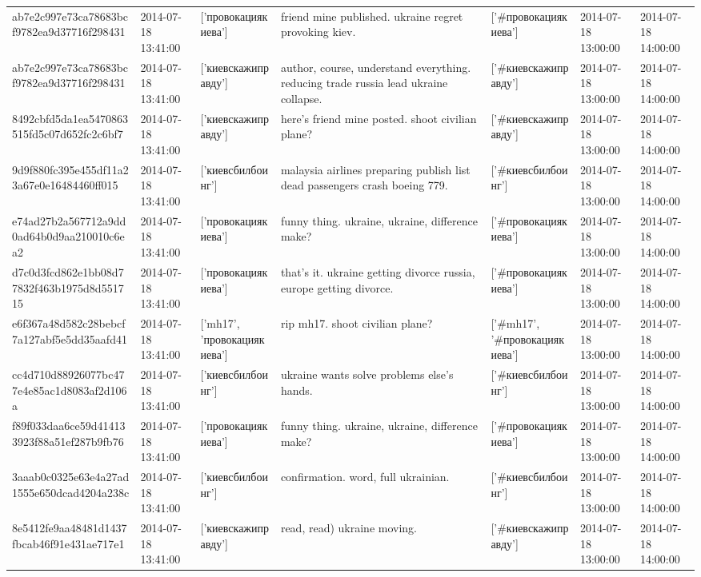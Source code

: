 \begin{tabular}{lllllll}
ab7e2c997e73ca78683bcf9782ea9d37716f298431 & 2014-07-18 13:41:00 & ['провокациякиева'] & friend mine published. ukraine regret provoking kiev. & ['#провокациякиева'] & 2014-07-18 13:00:00 & 2014-07-18 14:00:00 \\
ab7e2c997e73ca78683bcf9782ea9d37716f298431 & 2014-07-18 13:41:00 & ['киевскажиправду'] & author, course, understand everything. reducing trade russia lead ukraine collapse. & ['#киевскажиправду'] & 2014-07-18 13:00:00 & 2014-07-18 14:00:00 \\
8492cbfd5da1ea5470863515fd5c07d652fc2c6bf7 & 2014-07-18 13:41:00 & ['киевскажиправду'] & here's friend mine posted. shoot civilian plane? & ['#киевскажиправду'] & 2014-07-18 13:00:00 & 2014-07-18 14:00:00 \\
9d9f880fc395e455df11a23a67e0e16484460ff015 & 2014-07-18 13:41:00 & ['киевсбилбоинг'] & malaysia airlines preparing publish list dead passengers crash boeing 779. & ['#киевсбилбоинг'] & 2014-07-18 13:00:00 & 2014-07-18 14:00:00 \\
e74ad27b2a567712a9dd0ad64b0d9aa210010c6ea2 & 2014-07-18 13:41:00 & ['провокациякиева'] & funny thing. ukraine, ukraine, difference make? & ['#провокациякиева'] & 2014-07-18 13:00:00 & 2014-07-18 14:00:00 \\
d7c0d3fcd862e1bb08d77832f463b1975d8d551715 & 2014-07-18 13:41:00 & ['провокациякиева'] & that's it. ukraine getting divorce russia, europe getting divorce. & ['#провокациякиева'] & 2014-07-18 13:00:00 & 2014-07-18 14:00:00 \\
e6f367a48d582c28bebcf7a127abf5e5dd35aafd41 & 2014-07-18 13:41:00 & ['mh17', 'провокациякиева'] & rip mh17. shoot civilian plane? & ['#mh17', '#провокациякиева'] & 2014-07-18 13:00:00 & 2014-07-18 14:00:00 \\
cc4d710d88926077bc477e4e85ac1d8083af2d106a & 2014-07-18 13:41:00 & ['киевсбилбоинг'] & ukraine wants solve problems else's hands. & ['#киевсбилбоинг'] & 2014-07-18 13:00:00 & 2014-07-18 14:00:00 \\
f89f033daa6ce59d414133923f88a51ef287b9fb76 & 2014-07-18 13:41:00 & ['провокациякиева'] & funny thing. ukraine, ukraine, difference make? & ['#провокациякиева'] & 2014-07-18 13:00:00 & 2014-07-18 14:00:00 \\
3aaab0c0325e63e4a27ad1555e650dcad4204a238c & 2014-07-18 13:41:00 & ['киевсбилбоинг'] & confirmation. word, full ukrainian. & ['#киевсбилбоинг'] & 2014-07-18 13:00:00 & 2014-07-18 14:00:00 \\
8e5412fe9aa48481d1437fbcab46f91e431ae717e1 & 2014-07-18 13:41:00 & ['киевскажиправду'] & read, read) ukraine moving. & ['#киевскажиправду'] & 2014-07-18 13:00:00 & 2014-07-18 14:00:00 \\

\end{tabular}
